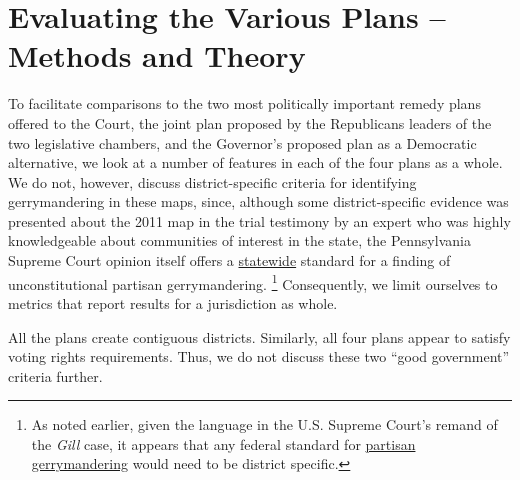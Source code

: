 \par
    \section{Evaluating the Various Plans -- Methods and Theory}
    To facilitate comparisons to the two most politically important remedy plans offered to the Court, the joint plan proposed by the Republicans leaders of the two legislative chambers, and the Governor’s proposed plan as a Democratic alternative, we look at a number of features in each of the four plans as a whole. We do not, however, discuss district-specific criteria for identifying gerrymandering in these maps, since, although some district-specific evidence was presented about the 2011 map in the trial testimony by an expert who was highly knowledgeable about communities of interest in the state, the Pennsylvania Supreme Court opinion itself offers a \underline{statewide} standard for a finding of unconstitutional partisan gerrymandering. 
        \footnote{As noted earlier, given the language in the U.S. Supreme Court’s remand of the \textit{Gill} case, it appears that any federal standard for \underline{partisan gerrymandering} would need to be district specific.}
    Consequently, we limit ourselves to metrics that report results for a jurisdiction as whole.
\par
    All the plans create contiguous districts. Similarly, all four plans appear to satisfy voting rights requirements. Thus, we do not discuss these two ``good government'' criteria further.
\par
